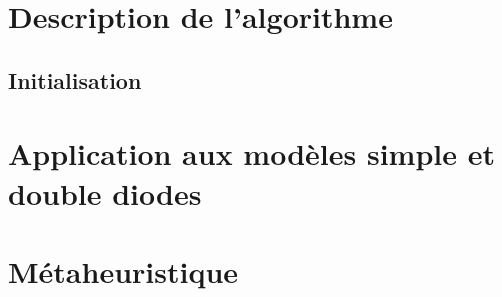 \section{Description de l'algorithme}

\subsection{Initialisation}


\section{Application aux modèles simple et double diodes}

\section{Métaheuristique}

% 
